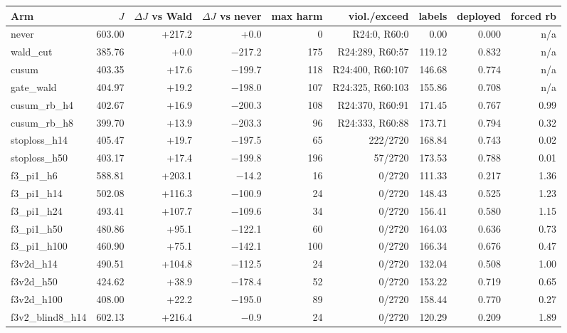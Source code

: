 \begin{tabular}{@{}l r r r r r r r r@{}}
\toprule
Arm & $J$ & $\Delta J$ vs Wald & $\Delta J$ vs never & max harm & viol./exceed & labels & deployed & forced rb \\
\midrule
never & 603.00 & +217.2 & +0.0 & 0 & R24:0, R60:0 & 0.00 & 0.000 & n/a \\
wald\_cut & 385.76 & +0.0 & $-$217.2 & 175 & R24:289, R60:57 & 119.12 & 0.832 & n/a \\
cusum & 403.35 & +17.6 & $-$199.7 & 118 & R24:400, R60:107 & 146.68 & 0.774 & n/a \\
gate\_wald & 404.97 & +19.2 & $-$198.0 & 107 & R24:325, R60:103 & 155.86 & 0.708 & n/a \\
cusum\_rb\_h4 & 402.67 & +16.9 & $-$200.3 & 108 & R24:370, R60:91 & 171.45 & 0.767 & 0.99 \\
cusum\_rb\_h8 & 399.70 & +13.9 & $-$203.3 & 96 & R24:333, R60:88 & 173.71 & 0.794 & 0.32 \\
stoploss\_h14 & 405.47 & +19.7 & $-$197.5 & 65 & 222/2720 & 168.84 & 0.743 & 0.02 \\
stoploss\_h50 & 403.17 & +17.4 & $-$199.8 & 196 & 57/2720 & 173.53 & 0.788 & 0.01 \\
f3\_pi1\_h6 & 588.81 & +203.1 & $-$14.2 & 16 & 0/2720 & 111.33 & 0.217 & 1.36 \\
f3\_pi1\_h14 & 502.08 & +116.3 & $-$100.9 & 24 & 0/2720 & 148.43 & 0.525 & 1.23 \\
f3\_pi1\_h24 & 493.41 & +107.7 & $-$109.6 & 34 & 0/2720 & 156.41 & 0.580 & 1.15 \\
f3\_pi1\_h50 & 480.86 & +95.1 & $-$122.1 & 60 & 0/2720 & 164.03 & 0.636 & 0.73 \\
f3\_pi1\_h100 & 460.90 & +75.1 & $-$142.1 & 100 & 0/2720 & 166.34 & 0.676 & 0.47 \\
f3v2d\_h14 & 490.51 & +104.8 & $-$112.5 & 24 & 0/2720 & 132.04 & 0.508 & 1.00 \\
f3v2d\_h50 & 424.62 & +38.9 & $-$178.4 & 52 & 0/2720 & 153.22 & 0.719 & 0.65 \\
f3v2d\_h100 & 408.00 & +22.2 & $-$195.0 & 89 & 0/2720 & 158.44 & 0.770 & 0.27 \\
f3v2\_blind8\_h14 & 602.13 & +216.4 & $-$0.9 & 24 & 0/2720 & 120.29 & 0.209 & 1.89 \\
\bottomrule
\end{tabular}
